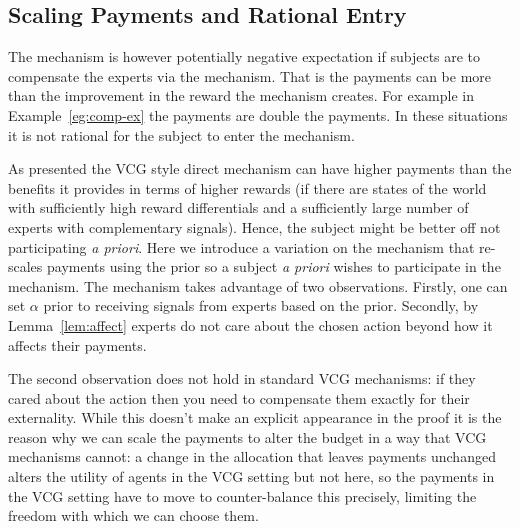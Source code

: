 \subsection{Scaling Payments and Rational Entry}

The mechanism is however potentially negative expectation if subjects are to compensate the experts via the mechanism.  
That is the payments can be more than the improvement in the reward the mechanism creates. For example in Example~\ref{eg:comp-ex} the payments are double the payments. In these situations it is not rational for the subject to enter the mechanism.


As presented the VCG style direct mechanism can have higher payments than the benefits it provides in terms of higher rewards (if there are states of the world with sufficiently high reward differentials and a sufficiently large number of experts with complementary signals). Hence, the subject might be better off not participating \emph{a priori}. Here we introduce a variation on the mechanism that re-scales payments using the prior so a subject \emph{a priori} wishes to participate in the mechanism. The mechanism takes advantage of two observations. Firstly, one can set $\alpha$ prior to receiving signals from experts based on the prior. Secondly, by Lemma~\ref{lem:affect} experts do not care about the chosen action beyond how it affects their payments. 

The second observation does not hold in standard VCG mechanisms: if they cared about the action then you need to compensate them exactly for their externality. While this doesn't make an explicit appearance in the proof it is the reason why we can scale the payments to alter the budget in a way that VCG mechanisms cannot: a change in the allocation that leaves payments unchanged alters the utility of agents in the VCG setting but not here, so the payments in the VCG setting have to move to counter-balance this precisely, limiting the freedom with which we can choose them.


